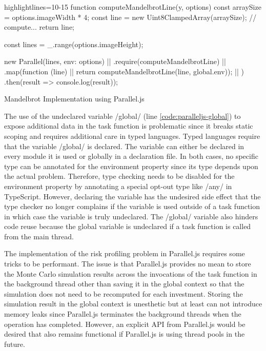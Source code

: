 \begin{listing}
	\begin{javascriptcode*}{highlightlines={10-15}}
function computeMandelbrotLine(y, options) {
	const arraySize = options.imageWidth * 4;
	const line = new Uint8ClampedArray(arraySize);
	// compute...
	return line;
}

const lines = _.range(options.imageHeight);

new Parallel(lines, {env: options}) |$\label{code:paralleljs-definition}$|
	.require(computeMandelbrotLine)  |$\label{code:paralleljs-require}$|
	.map(function (line) { |$\label{code:paralleljs-map}$|
		return computeMandelbrotLine(line, global.env)); |$\label{code:paralleljs-global}$|
	})
	.then(result => console.log(result));
\end{javascriptcode*}

\caption{Mandelbrot Implementation using Parallel.js}
\label{fig:mandelbrot-paralleljs}
\end{listing}


The use of the undeclared variable \javascriptinline/global/ (line \ref{code:paralleljs-global}) to expose additional data in the task function is problematic since it breaks static scoping and requires additional care in typed languages. Typed languages require that the variable \javascriptinline/global/ is declared. The variable can either be declared in every module it is used or globally in a declaration file. In both cases, no specific type can be annotated for the environment property since its type depends upon the actual problem. Therefore,  type checking needs to be disabled for the environment property by annotating a special opt-out type like \javascriptinline/any/ in TypeScript. However, declaring the variable has the undesired side effect that the type checker no longer complains if the variable is used outside of a task function in which case the variable is truly undeclared. The \javascriptinline/global/ variable also hinders code reuse because the global variable is undeclared if a task function is called from the main thread.

The implementation of the risk profiling problem in Parallel.js requires some tricks to be performant. The issue is that Parallel.js provides no mean to store the Monte Carlo simulation results across the invocations of the task function in the background thread other than saving it in the global context so that the simulation does not need to be recomputed for each investment. Storing the simulation result in the global context is unesthetic but at least can not introduce memory leaks since Parallel.js terminates the background threads when the operation has completed. However, an explicit API from Parallel.js would be desired that also remains functional if Parallel.js is using thread pools in the future.

